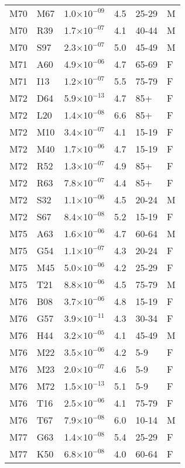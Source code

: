 \begin{longtable}{lllrll}
   M70 & M67 & 1.0$\times10^{-09}$ & 4.5 & 25-29 & M \\ 
   M70 & R39 & 1.7$\times10^{-07}$ & 4.1 & 40-44 & M \\ 
   M70 & S97 & 2.3$\times10^{-07}$ & 5.0 & 45-49 & M \\ 
   M71 & A60 & 4.9$\times10^{-06}$ & 4.7 & 65-69 & F \\ 
   M71 & I13 & 1.2$\times10^{-07}$ & 5.5 & 75-79 & F \\ 
   M72 & D64 & 5.9$\times10^{-13}$ & 4.7 & 85+ & F \\ 
   M72 & L20 & 1.4$\times10^{-08}$ & 6.6 & 85+ & F \\ 
   M72 & M10 & 3.4$\times10^{-07}$ & 4.1 & 15-19 & F \\ 
   M72 & M40 & 1.7$\times10^{-06}$ & 4.7 & 15-19 & F \\ 
   M72 & R52 & 1.3$\times10^{-07}$ & 4.9 & 85+ & F \\ 
   M72 & R63 & 7.8$\times10^{-07}$ & 4.4 & 85+ & F \\ 
   M72 & S32 & 1.1$\times10^{-06}$ & 4.5 & 20-24 & M \\ 
   M72 & S67 & 8.4$\times10^{-08}$ & 5.2 & 15-19 & F \\ 
   M75 & A63 & 1.6$\times10^{-06}$ & 4.7 & 60-64 & M \\ 
   M75 & G54 & 1.1$\times10^{-07}$ & 4.3 & 20-24 & F \\ 
   M75 & M45 & 5.0$\times10^{-06}$ & 4.2 & 25-29 & F \\ 
   M75 & T21 & 8.8$\times10^{-06}$ & 4.5 & 75-79 & M \\ 
   M76 & B08 & 3.7$\times10^{-06}$ & 4.8 & 15-19 & F \\ 
   M76 & G57 & 3.9$\times10^{-11}$ & 4.3 & 30-34 & F \\ 
   M76 & H44 & 3.2$\times10^{-05}$ & 4.1 & 45-49 & M \\ 
   M76 & M22 & 3.5$\times10^{-06}$ & 4.2 & 5-9 & F \\ 
   M76 & M23 & 2.0$\times10^{-07}$ & 4.6 & 5-9 & F \\ 
   M76 & M72 & 1.5$\times10^{-13}$ & 5.1 & 5-9 & F \\ 
   M76 & T16 & 2.5$\times10^{-06}$ & 4.1 & 75-79 & F \\ 
   M76 & T67 & 7.9$\times10^{-08}$ & 6.0 & 10-14 & M \\ 
   M77 & G63 & 1.4$\times10^{-08}$ & 5.4 & 25-29 & F \\ 
   M77 & K50 & 6.8$\times10^{-08}$ & 4.0 & 60-64 & F \\ 

\end{longtable}

